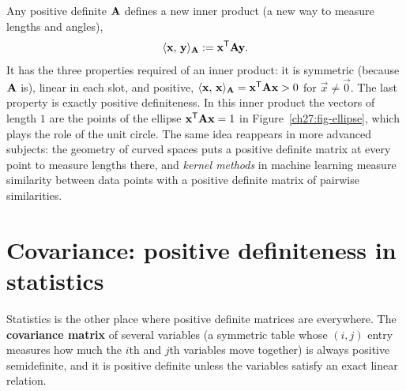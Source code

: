 \begin{connectionbox}
Any positive definite $\mathbf{A}$ defines a new inner product (a new way to measure lengths and
angles),
\[
  \langle \mathbf{x},\, \mathbf{y} \rangle_{\mathbf{A}} := \mathbf{x}^{\mathsf{T}}\mathbf{A}\mathbf{y}.
\]
It has the three properties required of an inner product: it is symmetric (because $\mathbf{A}$ is),
linear in each slot, and positive, $\langle \mathbf{x},\, \mathbf{x} \rangle_{\mathbf{A}} = \mathbf{x}^{\mathsf{T}}\mathbf{A}\mathbf{x}>0$
for $\vec{x}\neq\vec{0}$. The last property is exactly positive definiteness. In this inner product
the vectors of length $1$ are the points of the ellipse $\mathbf{x}^{\mathsf{T}}\mathbf{A}\mathbf{x}=1$ in
Figure~\ref{ch27:fig-ellipse}, which plays the role of the unit circle. The same idea reappears in
more advanced subjects: the geometry of curved spaces puts a positive definite matrix at every point
to measure lengths there, and \emph{kernel methods} in machine learning measure similarity between
data points with a positive definite matrix of pairwise similarities.
\end{connectionbox}

\section{Covariance: positive definiteness in statistics}
\label{ch27:sec-cov}

Statistics is the other place where positive definite matrices are everywhere. The
\textbf{covariance matrix} of several variables (a symmetric table whose $(i, j)$ entry measures how
much the $i$th and $j$th variables move together) is always positive semidefinite, and it is
positive definite unless the variables satisfy an exact linear relation.

